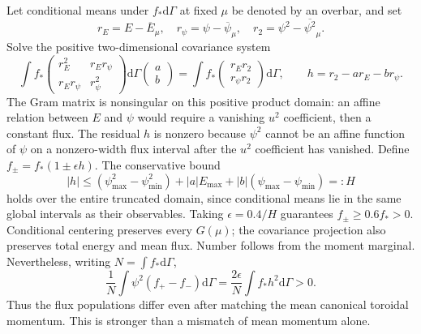 \documentclass[11pt,letterpaper]{article}
\newcommand{\dd}{\mathrm d}
\begin{document}
Let conditional means under $f_*\dd\Gamma$ at fixed $\mu$ be denoted by
an overbar, and set
\begin{equation}
 r_E=E-\overline E_\mu,\quad
 r_\psi=\psi-\overline\psi_\mu,\quad
 r_2=\psi^2-\overline{\psi^2}_\mu.
\end{equation}
Solve the positive two-dimensional covariance system
\begin{equation}
 \int f_*\begin{pmatrix}r_E^2&r_Er_\psi\\r_Er_\psi&r_\psi^2\end{pmatrix}
 \dd\Gamma\begin{pmatrix}a\\b\end{pmatrix}
 =\int f_*\begin{pmatrix}r_Er_2\\r_\psi r_2\end{pmatrix}\dd\Gamma,
 \qquad h=r_2-a r_E-b r_\psi.
 \label{eq:fluxcounterexampleprojection}
\end{equation}
The Gram matrix is nonsingular on this positive product domain: an affine
relation between $E$ and $\psi$ would require a vanishing $u^2$ coefficient,
then a constant flux. The residual $h$ is nonzero because $\psi^2$ cannot be
an affine function of $\psi$ on a nonzero-width flux interval after the
$u^2$ coefficient has vanished.
Define $f_\pm=f_*(1\pm\epsilon h)$. The conservative bound
\begin{equation}
 |h|\le(\psi_{\max}^2-\psi_{\min}^2)
      +|a|E_{\max}+|b|(\psi_{\max}-\psi_{\min})=:H
\end{equation}
holds over the entire truncated domain, since conditional means lie in the
same global intervals as their observables. Taking $\epsilon=0.4/H$
guarantees $f_\pm\ge0.6 f_*>0$. Conditional centering preserves every
$G(\mu)$; the covariance projection also preserves total energy and mean
flux. Number follows from the moment marginal. Nevertheless, writing
$N=\int f_*\dd\Gamma$,
\begin{equation}
 \frac1N\int\psi^2(f_+-f_-)\dd\Gamma
 =\frac{2\epsilon}{N}\int f_*h^2\dd\Gamma>0.
 \label{eq:fluxcounterexampleidentity}
\end{equation}
Thus the flux populations differ even after matching the mean canonical
toroidal momentum. This is stronger than a mismatch of mean momentum alone.
\end{document}
